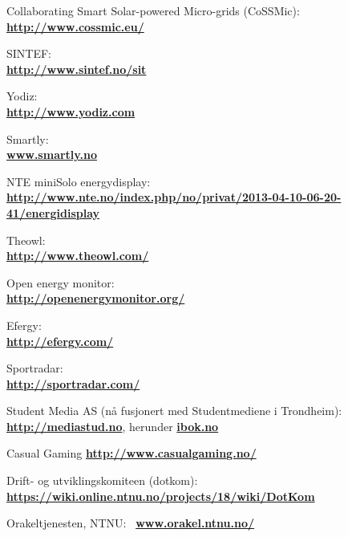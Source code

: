 \begin{thebibliography}{1}

 Collaborating Smart Solar-powered Micro-grids (CoSSMic):\\ \textbf{\url{http://www.cossmic.eu/}}

 SINTEF: \\
\textbf{ \url{ http://www.sintef.no/sit}}

 Yodiz: \\
\textbf{ \url{ http://www.yodiz.com}}
        
 Smartly: \\
\textbf{ \url{www.smartly.no}}

 NTE miniSolo energydisplay:\\
\textbf{ \url{http://www.nte.no/index.php/no/privat/2013-04-10-06-20-41/energidisplay}}

 Theowl:\\
\textbf{ \url{http://www.theowl.com/}}

 Open energy monitor:\\
\textbf{ \url{http://openenergymonitor.org/}}

 Efergy:\\
\textbf{ \url{http://efergy.com/}}

 Sportradar:\\
\textbf{ \url{http://sportradar.com/}}

 Student Media AS (nå fusjonert med Studentmediene i Trondheim):\\
\textbf{ \url{http://mediastud.no}}, herunder \textbf{ \url{ibok.no}}

 Casual Gaming
\textbf{ \url{http://www.casualgaming.no/}}

 Drift- og utviklingskomiteen (dotkom):\\
\textbf{ \url{https://wiki.online.ntnu.no/projects/18/wiki/DotKom}}

 Orakeltjenesten, NTNU:\
\textbf{ \url{www.orakel.ntnu.no/‎}}


\end{thebibliography}
